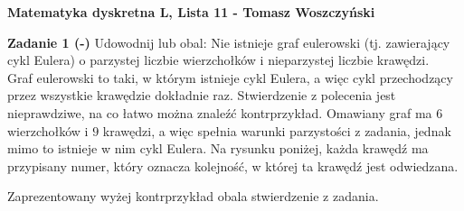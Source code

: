 \documentclass[a4paper,12pt]{article}
\begin{document}
\noindent \textbf{Matematyka dyskretna L, Lista 11 - Tomasz Woszczyński}\newline

\noindent \newline \textbf{Zadanie 1 (-)} \newline
Udowodnij lub obal: Nie istnieje graf eulerowski (tj. zawierający cykl Eulera)
o parzystej liczbie wierzchołków i nieparzystej liczbie krawędzi. \\

\noindent Graf eulerowski to taki, w którym istnieje cykl Eulera, a więc cykl
przechodzący przez wszystkie krawędzie dokładnie raz. Stwierdzenie z polecenia
jest nieprawdziwe, na co łatwo można znaleźć kontrprzykład. Omawiany graf ma
$6$ wierzchołków i $9$ krawędzi, a więc spełnia warunki parzystości z zadania,
jednak mimo to istnieje w nim cykl Eulera. Na rysunku poniżej, każda krawędź ma
przypisany numer, który oznacza kolejność, w której ta krawędź jest odwiedzana.

\begin{figure}[h]
    \centering
\end{figure}

\noindent Zaprezentowany wyżej kontrprzykład obala stwierdzenie z zadania.
\end{document}
